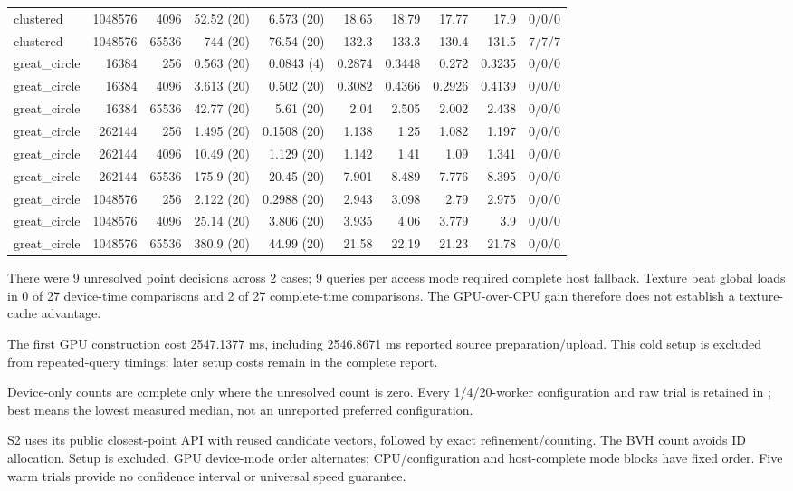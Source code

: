 \begin{longtable}{lrrrrrrrrr}
clustered & 1048576 & 4096 & 52.52 (20) & 6.573 (20) & 18.65 & 18.79 & 17.77 & 17.9 & 0/0/0 \\
clustered & 1048576 & 65536 & 744 (20) & 76.54 (20) & 132.3 & 133.3 & 130.4 & 131.5 & 7/7/7 \\
great\_circle & 16384 & 256 & 0.563 (20) & 0.0843 (4) & 0.2874 & 0.3448 & 0.272 & 0.3235 & 0/0/0 \\
great\_circle & 16384 & 4096 & 3.613 (20) & 0.502 (20) & 0.3082 & 0.4366 & 0.2926 & 0.4139 & 0/0/0 \\
great\_circle & 16384 & 65536 & 42.77 (20) & 5.61 (20) & 2.04 & 2.505 & 2.002 & 2.438 & 0/0/0 \\
great\_circle & 262144 & 256 & 1.495 (20) & 0.1508 (20) & 1.138 & 1.25 & 1.082 & 1.197 & 0/0/0 \\
great\_circle & 262144 & 4096 & 10.49 (20) & 1.129 (20) & 1.142 & 1.41 & 1.09 & 1.341 & 0/0/0 \\
great\_circle & 262144 & 65536 & 175.9 (20) & 20.45 (20) & 7.901 & 8.489 & 7.776 & 8.395 & 0/0/0 \\
great\_circle & 1048576 & 256 & 2.122 (20) & 0.2988 (20) & 2.943 & 3.098 & 2.79 & 2.975 & 0/0/0 \\
great\_circle & 1048576 & 4096 & 25.14 (20) & 3.806 (20) & 3.935 & 4.06 & 3.779 & 3.9 & 0/0/0 \\
great\_circle & 1048576 & 65536 & 380.9 (20) & 44.99 (20) & 21.58 & 22.19 & 21.23 & 21.78 & 0/0/0 \\
\end{longtable}
\endgroup

There were 9 unresolved point decisions across 2 cases; 9 queries per access mode required complete host fallback. Texture beat global loads in 0 of 27 device-time comparisons and 2 of 27 complete-time comparisons. The GPU-over-CPU gain therefore does not establish a texture-cache advantage.

The first GPU construction cost 2547.1377 ms, including 2546.8671 ms reported source preparation/upload. This cold setup is excluded from repeated-query timings; later setup costs remain in the complete report.

Device-only counts are complete only where the unresolved count is zero. Every 1/4/20-worker configuration and raw trial is retained in ; best means the lowest measured median, not an unreported preferred configuration.

S2 uses its public closest-point API with reused candidate vectors, followed by exact refinement/counting. The BVH count avoids ID allocation. Setup is excluded. GPU device-mode order alternates; CPU/configuration and host-complete mode blocks have fixed order. Five warm trials provide no confidence interval or universal speed guarantee.

